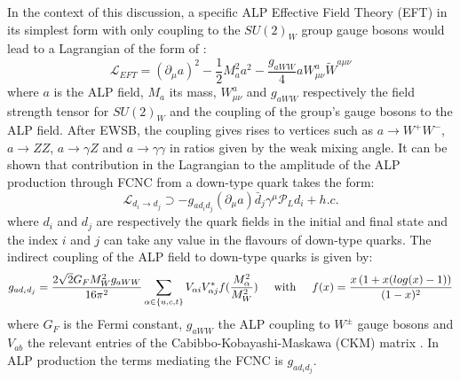 		In the context of this discussion, a specific ALP Effective Field Theory (EFT) in its simplest form with only coupling to the $SU(2)_W$ group gauge bosons would lead to a Lagrangian of the form of \cite{Moretti_MasterThesis}:
		\begin{equation}
			\mathcal{L}_{EFT} = \left( \partial_\mu a\right)^2 - \frac{1}{2} M_a^2 a^2 - \frac{g_{aWW}}{4} a W^a_{\mu \nu} \tilde{W}^{a \mu \nu}
		\end{equation} 
		where $a$ is the ALP field, $M_a$ its mass, $W^a_{\mu \nu}$ and $g_{aWW}$ respectively the field strength tensor for $SU(2)_W$ and the coupling of the group's gauge bosons to the ALP field. After EWSB, the coupling gives rises to vertices such as $a \rightarrow W^+ W^-$, $a \rightarrow Z Z$, $a \rightarrow \gamma Z$ and $a \rightarrow \gamma \gamma$ in ratios given by the weak mixing angle. It can be shown that contribution in the Lagrangian to the amplitude of the ALP production through FCNC from a down-type quark takes the form: 
		\begin{equation}
			\mathcal{L}_{d_i \rightarrow d_j} \supset - g_{a d_i d_j} \left( \partial_\mu a \right) \bar{d}_j \gamma^\mu \mathcal{P}_L d_i + h.c.
		\end{equation} 
		where $d_i$ and $d_j$ are respectively the quark fields in the initial and final state and the index $i$ and $j$ can take any value in the flavours of down-type quarks. The indirect coupling of the ALP field to down-type quarks is given by: 
		\begin{equation}
			g_{a d_i d_j} = \frac{2\sqrt{2}G_F M_W^2 g_{aWW}}{16 \pi^2} \sum_{\alpha \in \{u,c,t\}}V_{\alpha i} V^*_{\alpha j} f(\frac{M_{\alpha}^2}{M_{W}^2}) \hspace{5mm} \text{with} \hspace{5mm} f(x) = \frac{x \left( 1+x(log(x)-1) \right)}{(1-x)^2}
		\end{equation}
		where $G_F$ is the Fermi constant, $g_{aWW}$ the ALP coupling to $W^\pm$ gauge bosons and $V_{ab}$ the relevant entries of the Cabibbo-Kobayashi-Maskawa (CKM) matrix \cite{CKM}. In ALP production the terms mediating the FCNC is $g_{a d_i d_j}$. \\
		
